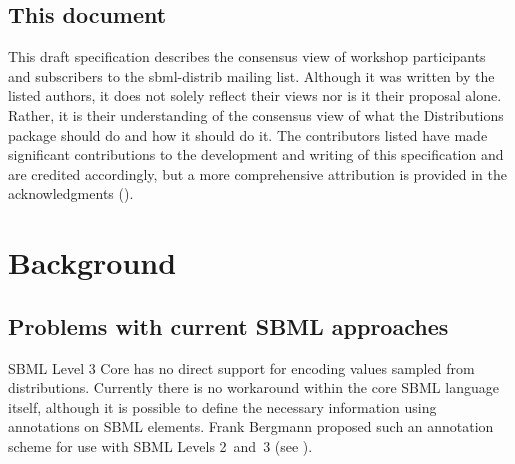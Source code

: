 \documentclass[draftspec]{sbmlpkgspec}
\newcommand{\distrib}{Distributions\xspace}
\newcommand{\watchout}{\marginpar{\hspace*{34pt}\raisebox{-0.5ex}{\Large\ding{43}}}}
\newcommand{\controversial}{\marginpar{\hspace*{34pt}\raisebox{-0.5ex}{\Large?}}}
\begin{document}
\subsection{This document}

This draft specification describes the consensus view of workshop participants and subscribers to the sbml-distrib mailing list. Although it was written by the listed authors, it does not solely reflect their views nor is it their proposal alone. Rather, it is their understanding of the consensus view of what the \distrib package should do and how it should do it. The contributors listed have made significant contributions to the development and writing of this specification and are credited accordingly, but a more comprehensive attribution is provided in the acknowledgments ().



\section{Background}

\subsection{Problems with current SBML approaches}

SBML Level 3 Core has no direct support for encoding values sampled from distributions. Currently there is no workaround within the core SBML
language itself, although it is possible to define the necessary information
using annotations on SBML elements. Frank Bergmann proposed such an annotation scheme for use with SBML Levels 2~and~3 (see ).
\end{document}
